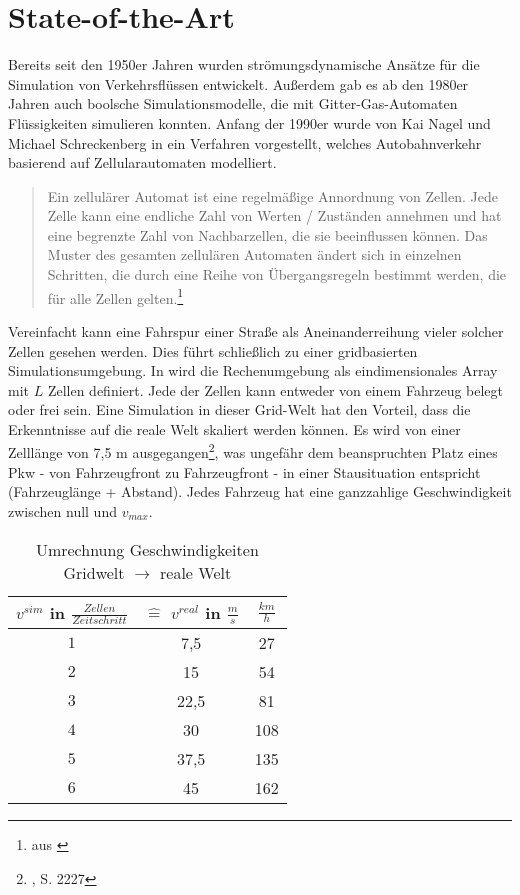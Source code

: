 \section{State-of-the-Art}
\label{sec:sota}

Bereits seit den 1950er Jahren wurden strömungsdynamische Ansätze für die Simulation von Verkehrsflüssen entwickelt. 
Außerdem gab es ab den 1980er Jahren auch boolsche Simulationsmodelle, die mit Gitter-Gas-Automaten Flüssigkeiten simulieren konnten.
Anfang der 1990er wurde von Kai Nagel und Michael Schreckenberg in \cite{na-sch} ein Verfahren vorgestellt, welches Autobahnverkehr basierend auf Zellularautomaten modelliert. 

\begin{quote}
Ein zellulärer Automat ist eine regelmäßige Annordnung von Zellen. Jede Zelle kann eine endliche Zahl von Werten / Zuständen annehmen und hat eine  begrenzte Zahl von Nachbarzellen, die sie beeinflussen können. Das Muster des gesamten zellulären Automaten ändert sich in einzelnen Schritten, die durch eine Reihe von Übergangsregeln bestimmt werden, die für alle Zellen gelten.\footnote{aus \cite{cell-autom}}
\end{quote}

Vereinfacht kann eine Fahrspur einer Straße als Aneinanderreihung vieler solcher Zellen gesehen werden. 
Dies führt schließlich zu einer gridbasierten Simulationsumgebung. 
In \cite{na-sch} wird die Rechenumgebung als eindimensionales Array mit $L$ Zellen definiert. 
Jede der Zellen kann entweder von einem Fahrzeug belegt oder frei sein. 
Eine Simulation in dieser Grid-Welt hat den Vorteil, dass die Erkenntnisse auf die reale Welt skaliert werden können. 
Es wird von einer Zelllänge von 7,5 m ausgegangen\footnote{\cite{na-sch}, S. 2227}, was ungefähr dem beanspruchten Platz eines Pkw - von Fahrzeugfront zu Fahrzeugfront - in einer Stausituation entspricht (Fahrzeuglänge + Abstand). 
Jedes Fahrzeug hat eine ganzzahlige Geschwindigkeit zwischen null und $v_{max}$.

\begin{table}[ht]
\begin{center}
\setlength{\tabcolsep}{0.5em} %
{\renewcommand{\arraystretch}{1.2}%
\begin{tabular}{| c | c | c |}
\hline 
$v^{sim}$ in $\frac{Zellen}{Zeitschritt}$ & $\widehat{=}$ $v^{real}$ in $\frac{m}{s}$ & $\frac{km}{h}$ \\ \hline 
$1$ & 7,5 & 27 \\ \hline
$2$ & 15 & 54 \\ \hline
$3$ & 22,5 & 81 \\ \hline
$4$ & 30 & 108 \\ \hline
$5$ & 37,5 & 135 \\ \hline
$6$ & 45 & 162 \\ \hline
\end{tabular}
}
\caption{Umrechnung Geschwindigkeiten Gridwelt $\rightarrow$ reale Welt}
\end{center}
\label{tab:umrechnung-zelle-kmh}
\end{table}

